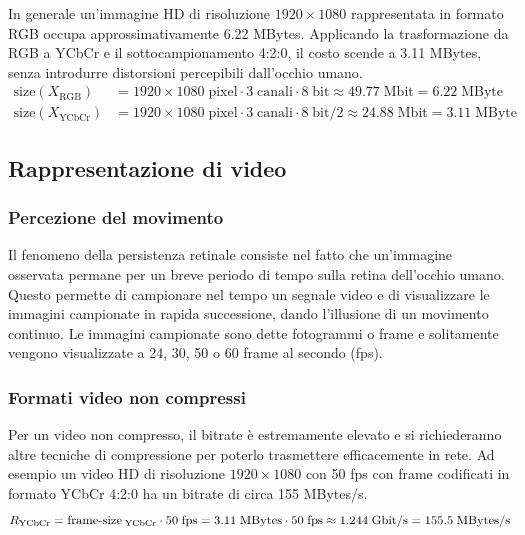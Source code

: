 \noindent
In generale un'immagine HD di risoluzione \(1920 \times 1080\) rappresentata in formato RGB occupa approssimativamente
6.22 MBytes. Applicando la trasformazione da RGB a YCbCr e il sottocampionamento 4:2:0, il costo scende a 3.11 MBytes,
senza introdurre distorsioni percepibili dall'occhio umano.
\begin{align*}
	\text{size}(X_\text{RGB}) &= 1920 \times 1080 \; \text{pixel} \cdot 3 \; \text{canali} \cdot 8 \; \text{bit} \approx 49.77 \; \text{Mbit} = 6.22 \; \text{MByte} \\
	\text{size}(X_\text{YCbCr}) &= 1920 \times 1080 \; \text{pixel} \cdot 3 \; \text{canali} \cdot 8 \; \text{bit} / 2 \approx 24.88 \; \text{Mbit} = 3.11 \; \text{MByte}
\end{align*}

\subsection{Rappresentazione di video}
\subsubsection*{Percezione del movimento}
Il fenomeno della persistenza retinale consiste nel fatto che un'immagine osservata permane per un breve periodo di tempo
sulla retina dell'occhio umano. Questo permette di campionare nel tempo un segnale video e di visualizzare le immagini
campionate in rapida successione, dando l'illusione di un movimento continuo. Le immagini campionate sono dette fotogrammi
o frame e solitamente vengono visualizzate a 24, 30, 50 o 60 frame al secondo (fps).

\subsubsection*{Formati video non compressi}
Per un video non compresso, il bitrate è estremamente elevato e si richiederanno altre tecniche di compressione per poterlo
trasmettere efficacemente in rete. Ad esempio un video HD di risoluzione \(1920 \times 1080\) con 50 fps con frame codificati
in formato YCbCr 4:2:0 ha un bitrate di circa 155 MBytes/s.
\[R_\text{YCbCr} = \text{frame-size}_\text{\;YCbCr} \cdot 50 \; \text{fps} = 3.11 \; \text{MBytes} \cdot 50 \; \text{fps} \approx 1.244 \; \text{Gbit/s} = 155.5 \; \text{MBytes/s}\]
